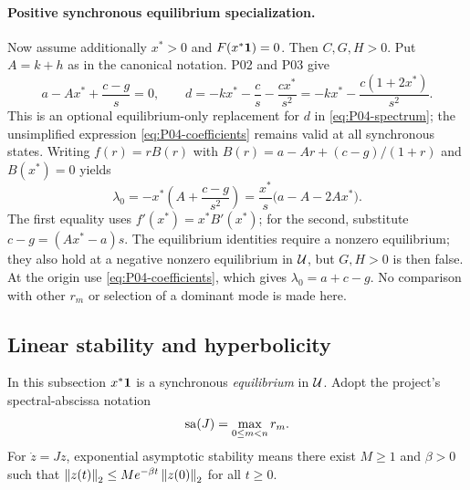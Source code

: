 \paragraph{Positive synchronous equilibrium specialization.}
Now assume additionally $x^*>0$ and $F(x^*\mathbf{1})=0$.
Then $C,G,H>0$. Put $A=k+h$ as in the canonical notation.
P02 and P03 give
\[
 a-Ax^*+\frac{c-g}{s}=0,\qquad
 d=-kx^*-\frac{c}{s}-\frac{cx^*}{s^2}
   =-kx^*-\frac{c(1+2x^*)}{s^2}.
\]
This is an optional equilibrium-only replacement for $d$ in
\eqref{eq:P04-spectrum}; the unsimplified expression
\eqref{eq:P04-coefficients} remains valid at all synchronous states.
Writing $f(r)=rB(r)$ with
$B(r)=a-Ar+(c-g)/(1+r)$ and $B(x^*)=0$ yields
\begin{equation}
 \boxed{\lambda_0=-x^*\left(A+\frac{c-g}{s^2}\right)
          =\frac{x^*}{s}\bigl(a-A-2Ax^*\bigr).}
 \label{eq:P04-equilibrium-zero-mode}
\end{equation}
The first equality uses $f'(x^*)=x^*B'(x^*)$; for the second,
substitute $c-g=(Ax^*-a)s$.
The equilibrium identities require a nonzero equilibrium; they also
hold at a negative nonzero equilibrium in $\mathcal{U}$, but $G,H>0$
is then false. At the origin use \eqref{eq:P04-coefficients}, which
gives $\lambda_0=a+c-g$. No comparison with other $r_m$ or selection
of a dominant mode is made here.

\subsection{Linear stability and hyperbolicity}
\label{slot:P04-3}

In this subsection $x^*\mathbf{1}$ is a synchronous \emph{equilibrium}
in $\mathcal{U}$. Adopt the project's spectral-abscissa notation
\begin{equation}
 \operatorname{sa}(J)=\max_{0\le m<n}r_m.
 \label{eq:P04-abscissa}
\end{equation}
For $\dot z=Jz$, exponential asymptotic stability means there exist
$M\ge1$ and $\beta>0$ such that
$\left\lVert z(t)\right\rVert_2\le Me^{-\beta t}\left\lVert z(0)\right\rVert_2$ for all $t\ge0$.

